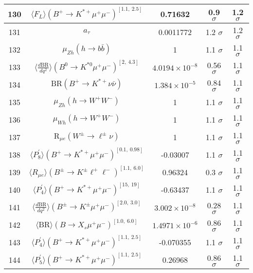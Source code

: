 \begin{longtable}{|c|c|c|c|c|}
130 &	 $\langle F_L\rangle(B^+\to K^{\ast +}\mu^+\mu^-)^{[1.1,\  2.5]}$ &	 0.71632 &	 \cellcolor{green!12}0.9 $ \sigma$ &	 1.2 $ \sigma$ \\ \hline
131 &	 $a_\tau$ &	 0.0011772 &	 1.2 $ \sigma$ &	 1.2 $ \sigma$ \\ \hline
132 &	 $\mu_{Zh}(h \to b\bar b)$ &	 1 &	 \cellcolor{red!0}1.1 $ \sigma$ &	 1.1 $ \sigma$ \\ \hline
133 &	 $\langle \frac{d\mathrm{BR}}{dq^2} \rangle(B^0\to K^{\ast 0}\mu^+\mu^-)^{[2,\  4.3]}$ &	 $4.0194\times 10^{-8}$ &	 \cellcolor{green!29}0.56 $ \sigma$ &	 1.1 $ \sigma$ \\ \hline
134 &	 $\mathrm{BR}(B^+\to K^{*+}\nu\bar\nu)$ &	 $1.384\times 10^{-5}$ &	 \cellcolor{green!14}0.84 $ \sigma$ &	 1.1 $ \sigma$ \\ \hline
135 &	 $\mu_{Zh}(h \to W^+W^-)$ &	 1 &	 \cellcolor{green!0}1.1 $ \sigma$ &	 1.1 $ \sigma$ \\ \hline
136 &	 $\mu_{Wh}(h \to W^+W^-)$ &	 1 &	 \cellcolor{green!0}1.1 $ \sigma$ &	 1.1 $ \sigma$ \\ \hline
137 &	 $\mathrm{R}_{\mu  e}(W^\pm\to \ell^\pm\nu)$ &	 1 &	 \cellcolor{red!0}1.1 $ \sigma$ &	 1.1 $ \sigma$ \\ \hline
138 &	 $\langle P_8^\prime\rangle(B^+\to K^{\ast +}\mu^+\mu^-)^{[0.1,\  0.98]}$ &	 -0.03007 &	 \cellcolor{green!0}1.1 $ \sigma$ &	 1.1 $ \sigma$ \\ \hline
139 &	 $\langle R_{\mu e} \rangle(B^\pm\to K^\pm \ell^+\ell^-)^{[1.1,\  6.0]}$ &	 0.96324 &	 \cellcolor{green!39}0.3 $ \sigma$ &	 1.1 $ \sigma$ \\ \hline
140 &	 $\langle P_4^\prime\rangle(B^+\to K^{\ast +}\mu^+\mu^-)^{[15,\  19]}$ &	 -0.63437 &	 \cellcolor{green!0}1.1 $ \sigma$ &	 1.1 $ \sigma$ \\ \hline
141 &	 $\langle \frac{d\mathrm{BR}}{dq^2} \rangle(B^\pm\to K^\pm \mu^+\mu^-)^{[2.0,\  3.0]}$ &	 $3.002\times 10^{-8}$ &	 \cellcolor{green!40}0.28 $ \sigma$ &	 1.1 $ \sigma$ \\ \hline
142 &	 $\langle \mathrm{BR} \rangle(B\to X_s\mu^+\mu^-)^{[1.0,\  6.0]}$ &	 $1.4971\times 10^{-6}$ &	 \cellcolor{green!11}0.86 $ \sigma$ &	 1.1 $ \sigma$ \\ \hline
143 &	 $\langle P_4^\prime\rangle(B^+\to K^{\ast +}\mu^+\mu^-)^{[1.1,\  2.5]}$ &	 -0.070355 &	 \cellcolor{red!0}1.1 $ \sigma$ &	 1.1 $ \sigma$ \\ \hline
144 &	 $\langle P_5^\prime\rangle(B^+\to K^{\ast +}\mu^+\mu^-)^{[1.1,\  2.5]}$ &	 0.26968 &	 \cellcolor{green!10}0.86 $ \sigma$ &	 1.1 $ \sigma$ \\ \hline

\end{longtable}
